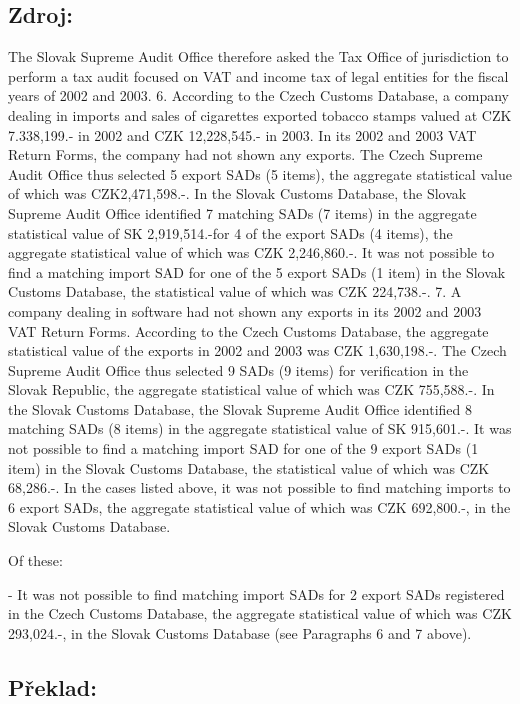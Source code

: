 \documentclass[10pt]{article}
\begin{document}
\subsection*{Zdroj:}

The Slovak Supreme Audit Office therefore asked the Tax Office of jurisdiction to perform a tax audit focused on VAT and income tax of legal entities for the fiscal years of 2002 and 2003.
6. According to the Czech Customs Database, a company dealing in imports and sales of cigarettes exported tobacco stamps valued at CZK 7.338,199.- in 2002 and CZK 12,228,545.- in 2003.
In its 2002 and 2003 VAT Return Forms, the company had not shown any exports.
The Czech Supreme Audit Office thus selected 5 export SADs (5 items), the aggregate statistical value of which was CZK2,471,598.-.
In the Slovak Customs Database, the Slovak Supreme Audit Office identified 7 matching SADs (7 items) in the aggregate statistical value of SK 2,919,514.-for 4 of the export SADs (4 items), the aggregate statistical value of which was CZK 2,246,860.-.
It was not possible to find a matching import SAD for one of the 5 export SADs (1 item) in the Slovak Customs Database, the statistical value of which was CZK 224,738.-.
7. A company dealing in software had not shown any exports in its 2002 and 2003 VAT Return Forms.
According to the Czech Customs Database, the aggregate statistical value of the exports in 2002 and 2003 was CZK 1,630,198.-.
The Czech Supreme Audit Office thus selected 9 SADs (9 items) for verification in the Slovak Republic, the aggregate statistical value of which was CZK 755,588.-.
In the Slovak Customs Database, the Slovak Supreme Audit Office identified 8 matching SADs (8 items) in the aggregate statistical value of SK 915,601.-.
It was not possible to find a matching import SAD for one of the 9 export SADs (1 item) in the Slovak Customs Database, the statistical value of which was CZK 68,286.-.
In the cases listed above, it was not possible to find matching imports to 6 export SADs, the aggregate statistical value of which was CZK 692,800.-, in the Slovak Customs Database.


Of these:

- It was not possible to find matching import SADs for 2 export SADs registered in the Czech Customs Database, the aggregate statistical value of which was CZK 293,024.-, in the Slovak Customs Database (see Paragraphs 6 and 7 above).


\pagebreak

\subsection*{Překlad:}
\end{document}
